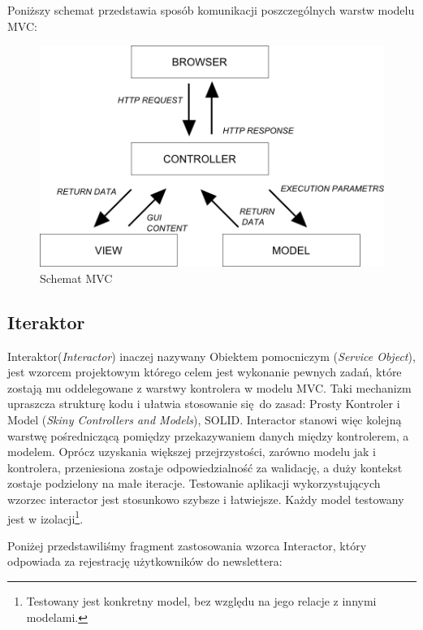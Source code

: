     Poniższy schemat przedstawia sposób komunikacji poszczególnych warstw modelu MVC:
    \begin{figure}[h]
      \centering
      \includegraphics[scale=0.87]{images/mvc_model.png}
      \caption{Schemat MVC}
    \end{figure}
  \subsection{Iteraktor}
  Interaktor\cite{interactors}(\emph{Interactor}) inaczej nazywany Obiektem pomocniczym (\emph{Service Object}), jest wzorcem projektowym którego celem jest wykonanie pewnych zadań, które zostają mu oddelegowane z warstwy kontrolera w modelu MVC. Taki mechanizm upraszcza strukturę kodu i ułatwia stosowanie się do zasad: Prosty Kontroler i Model (\emph{Skiny Controllers and Models}), SOLID.
  Interactor stanowi więc kolejną warstwę pośredniczącą pomiędzy przekazywaniem danych między kontrolerem, a modelem. Oprócz uzyskania większej przejrzystości, zarówno modelu jak i kontrolera, przeniesiona zostaje odpowiedzialność za walidację, a duży kontekst zostaje podzielony na małe iteracje. Testowanie aplikacji wykorzystujących wzorzec interactor jest stosunkowo szybsze i łatwiejsze. Każdy model testowany jest w izolacji\footnote{Testowany jest konkretny model, bez względu na jego relacje z innymi modelami.}.

  Poniżej przedstawiliśmy fragment zastosowania wzorca Interactor, który odpowiada za rejestrację użytkowników do newslettera:\\
  
